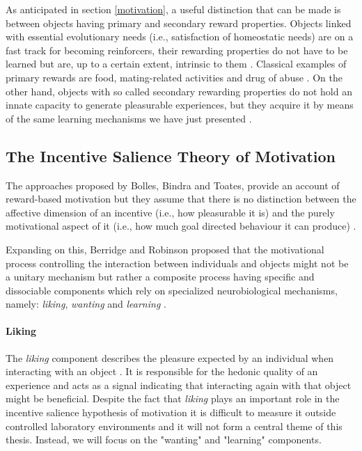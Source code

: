 As anticipated in section \ref{motivation}, a useful distinction that can be made is between objects having primary and secondary reward properties. Objects linked with essential evolutionary needs (i.e., satisfaction of homeostatic needs) are on a fast track for becoming reinforcers, their rewarding properties do not have to be learned but are, up to a certain extent, intrinsic to them \cite{sescousse2013processing}. Classical examples of primary rewards are food, mating-related activities and drug of abuse \cite{berridge2004motivation, simpson2016behavioral}. On the other hand, objects with so called secondary rewarding properties do not hold an innate capacity to generate pleasurable experiences, but they acquire it by means of the same learning mechanisms we have just presented \cite{sescousse2013processing}. 

\subsection{The Incentive Salience Theory of Motivation}
\label{incentive_salience}
The approaches proposed by Bolles, Bindra and Toates,  provide an account of reward-based motivation but they assume that there is no distinction between the affective dimension of an incentive (i.e., how pleasurable it is) and the purely motivational aspect of it (i.e., how much goal directed behaviour it can produce) \cite{bindra1978adaptive,toates1994comparing}. 

Expanding on this, Berridge and Robinson proposed that the motivational process controlling the interaction between individuals and objects might not be a unitary mechanism but rather a composite process having specific and dissociable components which rely on specialized neurobiological mechanisms, namely: \emph{liking}, \emph{wanting} and \emph{learning} \cite{berridge1998role,berridge2009dissecting,smith2011disentangling}.

\paragraph*{Liking}
\label{liking}
The \emph{liking} component describes the pleasure expected by an individual when interacting with an object \cite{berridge2009dissecting}. It is responsible for the hedonic quality of an experience and acts as a signal indicating that interacting again with that object might be beneficial. Despite the fact that \emph{liking} plays an important role in the incentive salience hypothesis of motivation it is difficult to measure it outside controlled laboratory environments \cite{berridge1998role} and it will not form a central theme of this thesis. Instead, we will focus on the "wanting" and "learning" components.

